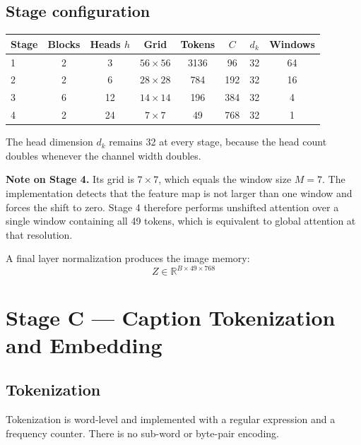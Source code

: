 \documentclass[12pt]{article}
\begin{document}
\subsection{Stage configuration}

\begin{center}
\begin{tabular}{@{}lccccccc@{}}
\toprule
Stage & Blocks & Heads $h$ & Grid & Tokens & $C$ & $d_k$ & Windows \\
\midrule
1 & 2 & 3  & $56\times56$ & 3136 & 96  & 32 & 64 \\
2 & 2 & 6  & $28\times28$ & 784  & 192 & 32 & 16 \\
3 & 6 & 12 & $14\times14$ & 196  & 384 & 32 & 4  \\
4 & 2 & 24 & $7\times7$   & 49   & 768 & 32 & 1  \\
\bottomrule
\end{tabular}
\end{center}

The head dimension $d_k$ remains 32 at every stage, because the head count doubles whenever the channel width doubles.

\textbf{Note on Stage 4.} Its grid is $7\times7$, which equals the window size $M=7$. The implementation detects that the feature map is not larger than one window and forces the shift to zero. Stage 4 therefore performs unshifted attention over a single window containing all 49 tokens, which is equivalent to global attention at that resolution.

A final layer normalization produces the image memory:
\begin{equation}
Z \in \mathbb{R}^{B \times 49 \times 768}
\end{equation}

\section{Stage C --- Caption Tokenization and Embedding}

\subsection{Tokenization}

Tokenization is word-level and implemented with a regular expression and a frequency counter. There is no sub-word or byte-pair encoding.
\end{document}
